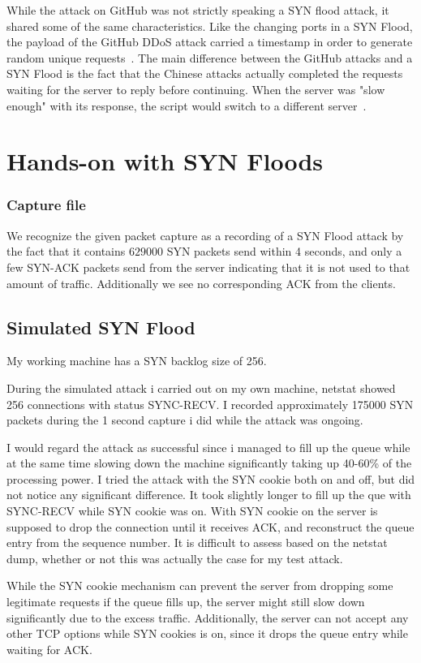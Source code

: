 \documentclass[12pt]{article}
\begin{document}
While the attack on GitHub was not strictly speaking a SYN flood attack, it shared some of the same characteristics. Like the changing ports in a SYN Flood, the payload of the GitHub DDoS attack carried a timestamp in order to generate random unique requests~\cite{greatfire}. The main difference between the GitHub attacks and a SYN Flood is the fact that the Chinese attacks actually completed the requests waiting for the server to reply before continuing. When the server was "slow enough" with its response, the script would switch to a different server~\cite{greatfire}.
 
\newpage

\section{Hands-on with SYN Floods}

\subsubsection{Capture file}

We recognize the given packet capture as a recording of a SYN Flood attack by the fact that it contains $629000$ SYN packets send within 4 seconds, and only a few SYN-ACK packets send from the server indicating that it is not used to that amount of traffic. Additionally we see no corresponding ACK from the clients. 

\subsection{Simulated SYN Flood}

My working machine has a SYN backlog size of 256.

During the simulated attack i carried out on my own machine, netstat showed 256 connections with status SYNC-RECV. 
I recorded approximately 175000 SYN packets during the 1 second capture i did while the attack was ongoing. 

I would regard the attack as successful since i managed to fill up the queue while at the same time slowing down the machine significantly taking up 40-60\% of the processing power.
I tried the attack with the SYN cookie both on and off, but did not notice any significant difference. It took slightly longer to fill up the que with SYNC-RECV while SYN cookie was on. With SYN cookie on the server is supposed to drop the connection until it receives ACK, and reconstruct the queue entry from the sequence number. It is difficult to assess based on the netstat dump, whether or not this was actually the case for my test attack.

While the SYN cookie mechanism can prevent the server from dropping some legitimate requests if the queue fills up, the server might still slow down significantly due to the excess traffic. Additionally, the server can not accept any other TCP options while SYN cookies is on, since it drops the queue entry while waiting for ACK.

\newpage


\nocite{*}

\end{document}
